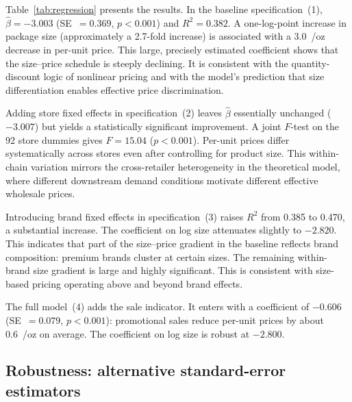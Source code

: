 \documentclass[12pt]{article}
\theoremstyle{definition}
\begin{document}
Table~\ref{tab:regression} presents the results.
In the baseline specification~(1), $\hat{\beta} = -3.003$ (SE~$= 0.369$, $p < 0.001$) and $R^2 = 0.382$.
A one-log-point increase in package size (approximately a 2.7-fold increase) is associated with a 3.0~\textcent/oz decrease in per-unit price.
This large, precisely estimated coefficient shows that the size--price schedule is steeply declining. It is consistent with the quantity-discount logic of nonlinear pricing and with the model's prediction that size differentiation enables effective price discrimination.

Adding store fixed effects in specification~(2) leaves $\hat{\beta}$ essentially unchanged ($-3.007$) but yields a statistically significant improvement. A joint $F$-test on the 92 store dummies gives $F = 15.04$ ($p < 0.001$).
Per-unit prices differ systematically across stores even after controlling for product size.
This within-chain variation mirrors the cross-retailer heterogeneity in the theoretical model, where different downstream demand conditions motivate different effective wholesale prices.

Introducing brand fixed effects in specification~(3) raises $R^2$ from 0.385 to 0.470, a substantial increase.
The coefficient on log size attenuates slightly to $-2.820$. This indicates that part of the size--price gradient in the baseline reflects brand composition: premium brands cluster at certain sizes.
The remaining within-brand size gradient is large and highly significant. This is consistent with size-based pricing operating above and beyond brand effects.

The full model~(4) adds the sale indicator. It enters with a coefficient of $-0.606$ (SE~$= 0.079$, $p < 0.001$): promotional sales reduce per-unit prices by about 0.6~\textcent/oz on average.
The coefficient on log size is robust at $-2.800$.



\subsection{Robustness: alternative standard-error estimators}
\end{document}
